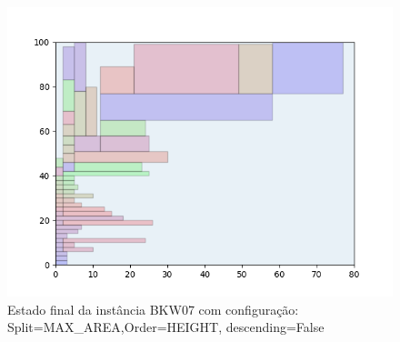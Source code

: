 \begin{figure}[H]
    \centering
    \caption[]{Estado final da instância BKW07 com configuração: Split=MAX_AREA,Order=HEIGHT, descending=False}
    \label{fig:bkw07-max_area-height-false}
    \includegraphics[scale=0.5]{output/figures/bkw/bkw07/max_area/height/false/00}
\end{figure}